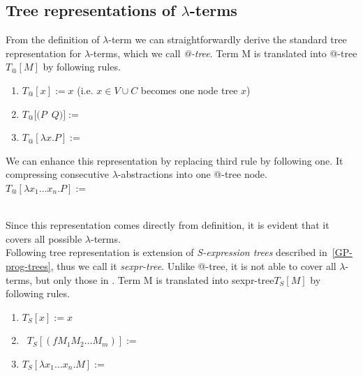 \documentclass[12pt,a4paper]{report}
\newcommand{\lterm}{$\lambda$-term\xspace}
\newcommand{\lterms}{$\lambda$-terms\xspace}
\begin{document}
\subsection{Tree representations of \lterms}
\label{tree-reps}

\newcommand{\sexprTree}{sexpr-tree\xspace}
\newcommand{\SexprTree}{Sexpr-tree\xspace}
\newcommand{\atTree}{@-tree\xspace}


From the definition of \lterm we can straightforwardly derive 
the standard tree representation for \lterms, which we call 
\textit{\atTree}. Term M is 
translated into \atTree $T_@[M]$ by following rules.


\begin{enumerate}
	\item $T_@[x] := x$ (i.e. $x \in V \cup C$ becomes one node tree $x$)
	\item \mbox{$T_@[(P$ $Q)] := $  }
	\item \mbox{$T_@[\lambda x . P] := $  }
\end{enumerate}


We can enhance this representation by replacing third rule
by following one. It compressing consecutive 
$\lambda$-abstractions into one \atTree node. \\

\mbox{$T_@[\lambda x_1 \dots x_n . P] := $  } 
	
	~\\

Since this representation comes directly from definition, 
it is evident that it covers all possible \lterms.\\
 
Following tree representation is extension of 
\textit{S-expression trees} described in~\ref{GP-prog-trees},
thus we call it \textit{\sexprTree}.
Unlike \atTree, it is not able to cover all \lterms, but only those
in \bnf. 
Term M is translated into \sexprTree $T_S[M]$ by following rules.



\begin{enumerate}
    \item $T_S[x] := x$
	\item \mbox{ $T_S[(f M_1 M_2 \dots M_m)] := $ 
		 }
	\item \mbox{$T_S[\lambda x_1 \dots x_n . M] := $
	 	 }
\end{enumerate}~
\end{document}
